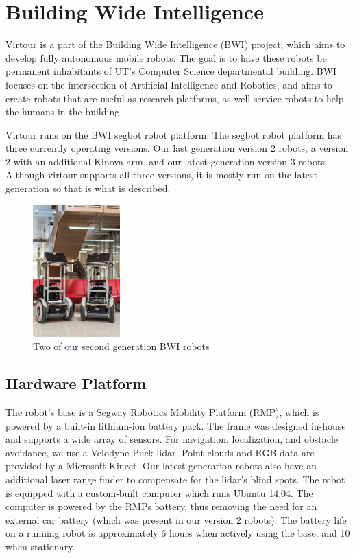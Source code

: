 \documentclass[
  oneside,
  11pt, a4paper,
  footinclude=true,
  headinclude=true,
  cleardoublepage=empty
]{article}
\begin{document}
\section{Building Wide Intelligence}

Virtour is a part of the Building Wide Intelligence (BWI) project,
which aims to develop fully autonomous mobile robots. The goal is to have these
robots be permanent inhabitants of UT's Computer Science departmental
building. BWI focuses on the intersection of Artificial Intelligence and
Robotics, and aims to create robots that are useful as research platforms, as
well service robots to help the humans in the building.

Virtour runs on the BWI segbot robot platform. The segbot robot platform
has three currently operating versions. Our last generation version 2 robots, a
version 2 with an additional Kinova arm, and our latest generation version 3
robots. Although virtour supports all three versions, it is mostly run on the
latest generation so that is what is described.

\begin{figure}
\centering
\includegraphics[height=2in]{bwi}
\caption{Two of our second generation BWI robots}
\end{figure}

\subsection{Hardware Platform}

The robot's base is a Segway Robotics Mobility Platform (RMP), which is powered
by a built-in lithium-ion battery pack. The frame was designed in-house and
supports a wide array of sensors. For navigation, localization, and obstacle
avoidance, we use a Velodyne Puck lidar. Point clouds and RGB data are provided
by a Microsoft Kinect. Our latest generation robots also have an additional
laser range finder to compensate for the lidar's blind spots. The robot is
equipped with a custom-built computer which runs Ubuntu 14.04. The computer is
powered by the RMPs battery, thus removing the need for an external car battery
(which was present in our version 2 robots).  The battery life on a running
robot is approximately 6 hours when actively using the base, and 10 when
stationary.
\end{document}
